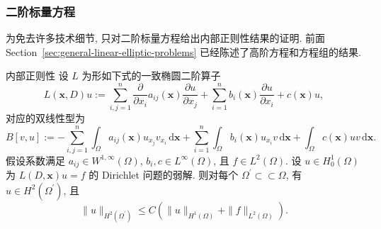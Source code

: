 \subsubsection{二阶标量方程}\label{subsec:second-order-scalar-interior-regularity}

为免去许多技术细节, 只对二阶标量方程给出内部正则性结果的证明. 前面 Section~\ref{sec:general-linear-elliptic-problems} 已经陈述了高阶方程和方程组的结果.

\begin{Theorem}{内部正则性}
\label{thm:second-order-interior-regularity}
设 $L$ 为形如下式的一致椭圆二阶算子\[L(\bm{x},D)u:=\sum_{i,j=1}^n\frac{\partial}{\partial x_i}a_{ij}(\bm{x})\frac{\partial u}{\partial x_j}+\sum_{i=1}^nb_i(\bm{x})\frac{\partial u}{\partial x_i}+c(\bm{x})u,\]对应的双线性型为\[B[v,u]:=-\sum_{i,j=1}^n\int_\Omega a_{ij}(\bm{x})u_{x_j}v_{x_i}\,\mathrm{d}\bm{x}+\sum_{i=1}^n\int_\Omega b_i(\bm{x})u_{x_i}v\,\mathrm{d}\bm{x}+\int_\Omega c(\bm{x})uv\,\mathrm{d}\bm{x}.\]假设系数满足 $a_{ij}\in W^{1,\infty}(\Omega)$, $b_i,c\in L^\infty(\Omega)$, 且 $f\in L^2(\Omega)$. 设 $u\in H_0^1(\Omega)$ 为 $L(D,\bm{x})u=f$ 的 Dirichlet 问题的弱解. 则对每个 $\Omega^{\prime}\subset\subset\Omega$, 有 $u\in H^2(\Omega^{\prime})$, 且
\begin{equation}\label{eq:second-order-interior-regularity-h2-estimate}
\|u\|_{H^2(\Omega^{\prime})}\leq C(\|u\|_{H^1(\Omega)}+\|f\|_{L^2(\Omega)}).
\end{equation}

\end{Theorem}


